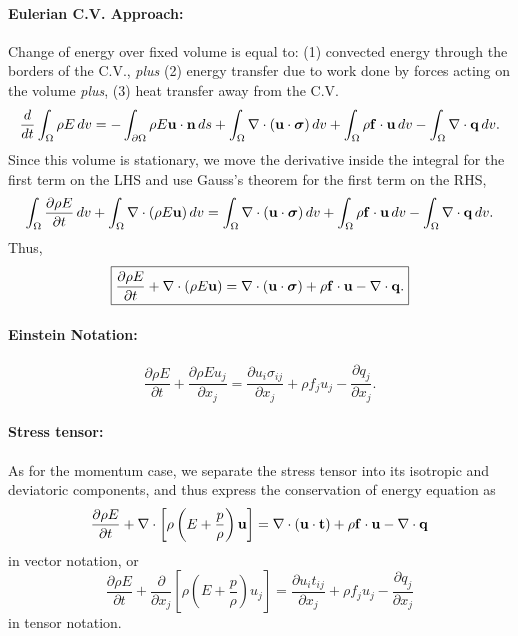 \documentclass[oneside,a4paper,11pt]{report}
\begin{document}
\paragraph{Eulerian C.V. Approach:}
Change of energy over fixed volume is equal to: (1) convected energy through the borders of the C.V., \textit{plus} (2) energy transfer due to work done by forces acting on the volume \textit{plus}, (3) heat transfer away from the C.V.
\begin{equation}
\frac{d}{dt}\int_\Omega \rho E \,dv=-\int_{\partial \Omega} \rho E \mathbf{u} \cdot \mathbf{n} \, ds + \int_{\Omega} \nabla \cdot (\mathbf{u} \cdot \boldsymbol{\sigma}) \,dv + \int_{\Omega} \rho \mathbf{f} \cdot \mathbf{u} \,dv - \int_{\Omega} \nabla \cdot \mathbf{q} \, dv.
\end{equation}
Since this volume is stationary, we move the derivative inside the integral for the first term on the LHS and use Gauss's theorem for the first term on the RHS,
\begin{equation}
\int_\Omega \frac{\partial \rho E}{\partial t}\,dv + \int_\Omega \nabla \cdot ( \rho E \mathbf{u} ) \,dv = \int_\Omega \nabla \cdot ( \mathbf{u} \cdot \boldsymbol{\sigma} ) \,dv + \int_\Omega \rho \mathbf{f} \cdot \mathbf{u} \,dv - \int_\Omega \nabla \cdot \mathbf{q}\,dv.
\end{equation}
Thus,
\begin{equation}
    \label{eq:energy_conservation_vector}
    \boxed{\frac{\partial \rho E}{\partial t} + \nabla \cdot ( \rho E \mathbf{u} ) = \nabla\cdot(\mathbf{u} \cdot \boldsymbol{\sigma}) + \rho \mathbf{f} \cdot \mathbf{u} - \nabla\cdot\mathbf{q}.}
\end{equation}

\paragraph{Einstein Notation:}
\begin{equation}
    \label{eq:energy_conservation_tensor}
    \boxed{\frac{\partial \rho E}{\partial t} + \frac{\partial \rho E u_j}{\partial x_j} = \frac{\partial u_i\sigma_{ij}}{\partial x_j} + \rho f_j u_j - \frac{\partial q_j}{\partial x_j}.}
\end{equation}

\paragraph{Stress tensor:}
As for the momentum case, we separate the stress tensor into its isotropic and deviatoric components, and thus express the conservation of energy equation as 
\begin{equation}
    \frac{\partial \rho E}{\partial t} + \nabla \cdot \left [\rho \left ( E  + \frac{p}{\rho} \right ) \mathbf{u} \right] = \nabla\cdot(\mathbf{u} \cdot \mathbf{t} ) + \rho \mathbf{f} \cdot \mathbf{u} - \nabla \cdot \mathbf{q}
\end{equation}
in vector notation, or 
\begin{equation}
    \frac{\partial \rho E}{\partial t} + \frac{\partial}{\partial x_j} \left [ \rho \left ( E + \frac{p}{\rho} \right ) u_j \right ] = \frac{\partial u_i t_{ij}}{\partial x_j} + \rho f_j u_j - \frac{\partial q_j}{\partial x_j}
\end{equation}
in tensor notation.
\end{document}
